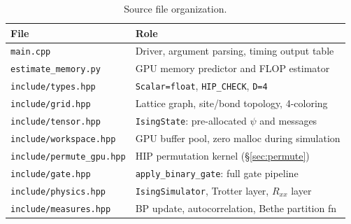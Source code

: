 \documentclass[11pt]{article}
\begin{document}
\begin{table}[ht]
\centering
\caption{Source file organization.}
\label{tab:files}
\begin{tabular}{ll}
\toprule
File & Role \\
\midrule
\texttt{main.cpp}           & Driver, argument parsing, timing output table \\
\texttt{estimate\_memory.py}& GPU memory predictor and FLOP estimator \\
\texttt{include/types.hpp}  & \texttt{Scalar=float}, \texttt{HIP\_CHECK}, \texttt{D=4} \\
\texttt{include/grid.hpp}   & Lattice graph, site/bond topology, 4-coloring \\
\texttt{include/tensor.hpp} & \texttt{IsingState}: pre-allocated $\psi$ and messages \\
\texttt{include/workspace.hpp} & GPU buffer pool, zero malloc during simulation \\
\texttt{include/permute\_gpu.hpp} & HIP permutation kernel (\S\ref{sec:permute}) \\
\texttt{include/gate.hpp}   & \texttt{apply\_binary\_gate}: full gate pipeline \\
\texttt{include/physics.hpp}& \texttt{IsingSimulator}, Trotter layer, $R_{xx}$ layer \\
\texttt{include/measures.hpp} & BP update, autocorrelation, Bethe partition fn \\
\bottomrule
\end{tabular}
\end{table}
\end{document}
